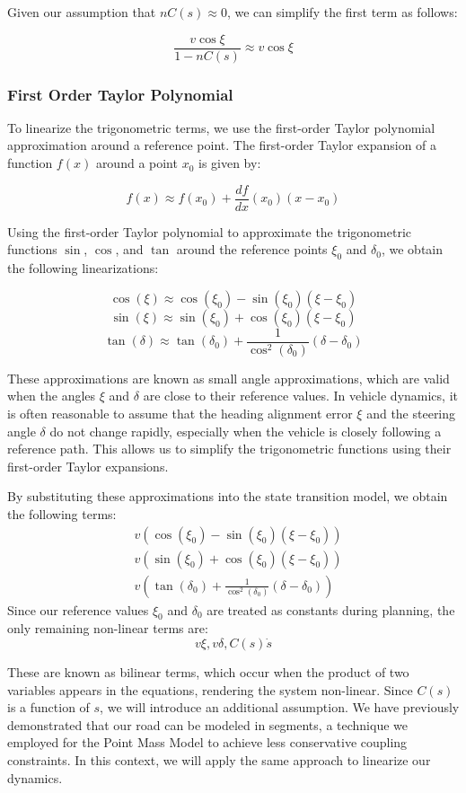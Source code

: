 Given our assumption that $nC(s) \approx 0$, we can simplify the first term as follows:

\[ \frac{v \cos\xi}{1 - nC(s)} \approx v
	\cos\xi \]

\subsubsection{First Order Taylor Polynomial} To linearize the trigonometric terms, we use the first-order Taylor
polynomial approximation around a reference point.
The first-order Taylor expansion of a function $f(x)$ around a point $x_0$ is given by:

\[ f(x) \approx f(x_0) + \frac{df}{dx}
	(x_0) (x - x_0) \]

Using the first-order Taylor polynomial to approximate the trigonometric functions $\sin$, $\cos$, and $\tan$
around the reference points $\xi_0$ and $\delta_0$, we obtain the following linearizations:

\[ \cos(\xi) \approx \cos(\xi_0) -
	\sin(\xi_0) (\xi - \xi_0) \] \[ \sin(\xi) \approx \sin(\xi_0) + \cos(\xi_0) (\xi - \xi_0) \] \[ \tan(\delta) \approx \tan(\delta_0) +
	\frac{1}{\cos^2(\delta_0)} (\delta - \delta_0) \]

These approximations are known as small angle approximations, which are valid
when the angles $\xi$ and $\delta$ are close to their reference values.
In vehicle dynamics, it is often reasonable to assume that the heading alignment error $\xi$ and the steering angle $\delta$ do not change rapidly,
especially when the vehicle is closely following a reference path.
This allows us to simplify the trigonometric functions using their first-order Taylor expansions.

By substituting these approximations into the state transition model, we obtain the following terms:
\begin{align*}
	 & v (\cos(\xi_0) - \sin(\xi_0) (\xi - \xi_0))                         \\
	 & v (\sin(\xi_0) + \cos(\xi_0) (\xi - \xi_0))                         \\
	 & v (\tan(\delta_0) + \frac{1}{\cos^2(\delta_0)} (\delta - \delta_0))
\end{align*}
Since our reference values $\xi_0$ and $\delta_0$ are treated as constants during planning, the only remaining non-linear terms are: $$v \xi, v
	\delta, C(s)\dot{s}$$

These are known as bilinear terms, which occur when the product of two variables appears in the equations,
rendering the system non-linear.
Since $C(s)$ is a function of $s$, we will introduce an additional assumption.
We have previously demonstrated that our road can be modeled in segments, a technique we employed for the Point Mass Model to achieve less
conservative coupling constraints.
In this context, we will apply the same approach to linearize our dynamics.

